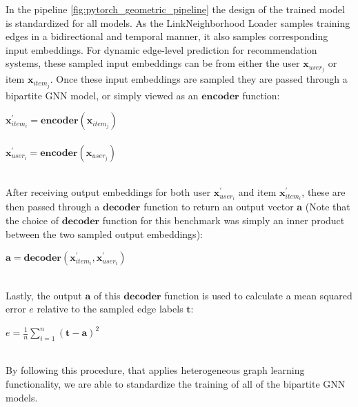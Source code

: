 \documentclass{scrartcl}
\begin{document}
In the pipeline \ref{fig:pytorch_geometric_pipeline} the design of the trained model is standardized for all models. As the LinkNeighborhood Loader samples training edges in a bidirectional and temporal manner, it also samples corresponding input embeddings. For dynamic edge-level prediction for recommendation systems, these sampled input embeddings can be from either the user $\mathbf{x}_{user_{j}}$ or item $\mathbf{x}_{item_{j}}$. Once these input embeddings are sampled they are passed through a bipartite GNN model, or simply viewed as an $\textbf{encoder}$ function: \\ 

\begin{center}
    $\mathbf{x}^{\prime}_{item_{i}} = \textbf{encoder}(\mathbf{x}_{item_{j}})$ \\~\\ 
    $\mathbf{x}^{\prime}_{user_{i}} = \textbf{encoder}(\mathbf{x}_{user_{j}})$ \\~\\
\end{center} 

After receiving output embeddings for both user $\mathbf{x}^{\prime}_{user_{i}}$ and item $\mathbf{x}^{\prime}_{item_{i}}$, these are then passed through a $\textbf{decoder}$ function to return an output vector $\mathbf{a}$  (Note that the choice of $\textbf{decoder}$ function for this benchmark was simply an inner product between the two sampled output embeddings): \\ 

\begin{center}
    $\mathbf{a} = \textbf{decoder}(\mathbf{x}^{\prime}_{item_{i}},\mathbf{x}^{\prime}_{user_{i}})$ \\~\\
\end{center} 

Lastly, the output $\mathbf{a}$ of this $\textbf{decoder}$ function is used to calculate a mean squared error $e$ relative to the sampled edge labels $\mathbf{t}$:

\begin{center}
    $e = \frac{1}{n} \sum_{i=1}^{n} (\mathbf{t} - \mathbf{a})^2$\\~\\
\end{center}

By following this procedure, that applies heterogeneous graph learning functionality, we are able to standardize the training of all of the bipartite GNN models. \\ 
\end{document}
